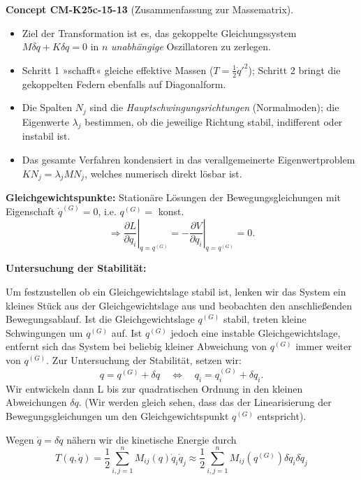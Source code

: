 \documentclass[10pt, letterpaper]{article}
\newcommand{\CustomHeading}[3]{%
  \par\medskip\noindent%
  \textbf{#1 #2} \textnormal{(#3)}.\enskip%
}
\newenvironment{CONC}[2]{\begin{unitbox}\CustomHeading{Concept}{#1}{#2}}{\end{unitbox}}
\begin{document}
\begin{CONC}{CM-K25c-15-13}{Zusammenfassung zur Massematrix}
\begin{itemize}[leftmargin=*]
\item Ziel der Transformation ist es,
      das gekoppelte Gleichungs­system
      \(M\ddot{\delta q}+K\delta q=0\)
      in \(n\) \emph{unabhängige} Oszillatoren zu zerlegen.
\item Schritt 1 »schafft« gleiche effektive Massen
      (\(T=\tfrac12\dot q'^{\!2}\));
      Schritt 2 bringt die gekoppelten Federn ebenfalls
      auf Diagonalform.
\item Die Spalten \(N_j\) sind die
      \emph{Hauptschwingungsrichtungen} (Normalmoden);
      die Eigenwerte \(\lambda_j\) bestimmen,
      ob die jeweilige Richtung stabil, indifferent
      oder instabil ist.
\item Das gesamte Verfahren kondensiert in
      das verallgemeinerte Eigenwertproblem
      \(K N_j=\lambda_j M N_j\),
      welches numerisch direkt lösbar ist.
\end{itemize}
\end{CONC}








\noindent\textbf{Gleichgewichtspunkte:} Stationäre Lösungen der Bewegungsgleichungen mit Eigenschaft $\dot{q}^{(G)}=0$, i.e. $q^{(G)}=$ konst.
\[\Rightarrow \left.\frac{\partial L}{\partial q_i}\right|_{q=q^{(G)}}=-\left.\frac{\partial V}{\partial q_i}\right|_{q=q^{(G)}}=0.\]

\noindent\textbf{Untersuchung der Stabilität:}

Um festzustellen ob ein Gleichgewichtslage stabil ist, lenken wir das System ein kleines Stück aus der Gleichgewichtslage aus und beobachten den anschließenden Bewegungsablauf. Ist die Gleichgewichtslage $q^{(G)}$ stabil, treten kleine Schwingungen um $q^{(G)}$ auf. Ist $q^{(G)}$ jedoch eine instable Gleichgewichtslage, entfernt sich das System bei beliebig kleiner Abweichung von $q^{(G)}$ immer weiter von $q^{(G)}$. Zur Untersuchung der Stabilität, setzen wir:
\[q=q^{(G)}+\delta q \quad \Leftrightarrow \quad q_i=q_i^{(G)}+\delta q_i.\]
Wir entwickeln dann L bis zur quadratischen Ordnung in den kleinen Abweichungen $\delta q$. (Wir werden gleich sehen, dass das der Linearisierung der Bewegungsgleichungen um den Gleichgewichtspunkt $q^{(G)}$ entspricht).

Wegen $\dot{q}=\delta\dot{q}$ nähern wir die kinetische Energie durch
\[T(q,\dot{q})=\frac{1}{2}\sum_{i,j=1}^n M_{ij}(q)\dot{q}_i\dot{q}_j \approx \frac{1}{2}\sum_{i,j=1}^n M_{ij}(q^{(G)})\delta\dot{q}_i\delta\dot{q}_j\]
\end{document}
